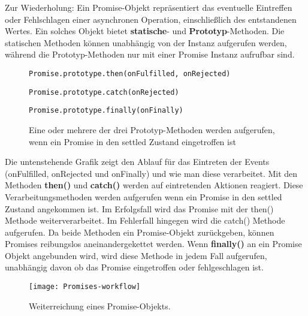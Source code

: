 Zur Wiederholung: Ein Promise-Objekt repräsentiert das eventuelle Eintreffen oder Fehlschlagen einer asynchronen Operation, einschließlich des entstandenen Wertes. Ein solches Objekt bietet \textbf{statische}- und \textbf{Prototyp}-Methoden. Die statischen Methoden können unabhängig von der Instanz aufgerufen werden, während die Prototyp-Methoden nur mit einer Promise Instanz aufrufbar sind.

\begin{description}

\begin{figure}[H]
\item \begin{lstlisting}[basicstyle=\small]
Promise.prototype.then(onFulfilled, onRejected)
\end{lstlisting}

\item \begin{lstlisting}[basicstyle=\small]
Promise.prototype.catch(onRejected)
\end{lstlisting}


\item \begin{lstlisting}[basicstyle=\small]
Promise.prototype.finally(onFinally)
\end{lstlisting}
\caption{Eine oder mehrere der drei Prototyp-Methoden werden aufgerufen, wenn ein Promise in den settled Zustand eingetroffen ist}
\end{figure}

\end{description}

\noindent
Die untenstehende Grafik zeigt den Ablauf für das Eintreten der Events (onFulfilled, onRejected und onFinally) und wie man diese verarbeitet. Mit den Methoden \textbf{then()} und \textbf{catch()} werden auf eintretenden Aktionen reagiert. Diese Verarbeitungsmethoden werden aufgerufen wenn ein Promise in den settled Zustand angekommen ist. Im Erfolgsfall wird das Promise mit der then() Methode weiterverarbeitet. Im Fehlerfall hingegen wird die catch() Methode aufgerufen. Da beide Methoden ein Promise-Objekt zurückgeben, können Promises reibungslos aneinandergekettet werden. Wenn \textbf{finally()} an ein Promise Objekt angebunden wird, wird diese Methode in jedem Fall aufgerufen, unabhängig davon ob das Promise eingetroffen oder fehlgeschlagen ist.

\begin{figure}[H]
\texttt{[image: Promises-workflow]}
\caption{Weiterreichung eines Promise-Objekts\cite{promise-executor}.}
\end{figure}

